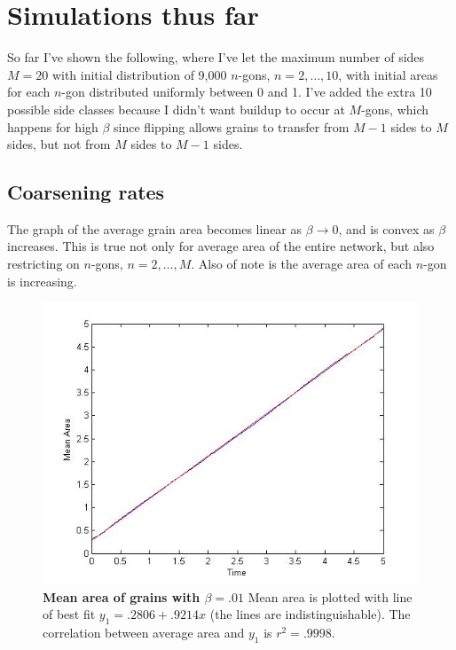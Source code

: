 \documentclass{amsart}
\begin{document}
\section{Simulations thus far}
So far I've shown the following, where I've let the maximum number of sides $M= 20$ with initial distribution of 9,000 $n$-gons, $n= 2, \dots, 10$, with initial areas for each $n$-gon distributed uniformly between 0 and 1. I've added the extra 10 possible side classes because I didn't want buildup to occur at $M$-gons, which happens for high $\beta$ since flipping allows grains to transfer from $M-1$ sides to $M$ sides, but not from $M$ sides to $M-1$ sides.
\subsection{Coarsening rates}
The graph of the average grain area becomes linear as $\beta \rightarrow 0$, and is convex as $\beta$ increases.  This is true not only for average area of the entire network, but also restricting on $n$-gons, $n= 2, \dots, M$.  Also of note is the average area of each $n$-gon is increasing.
 \begin{figure}
\includegraphics{meanregareazero.jpg}
\caption{\textbf{Mean area of grains with $\beta = .01$} Mean area is plotted with line of best fit $y_1 = .2806+.9214x$  (the lines are indistinguishable). The correlation between average area and $y_1$ is $r^2= .9998$. }\label{av1}
\end{figure}
\end{document}
